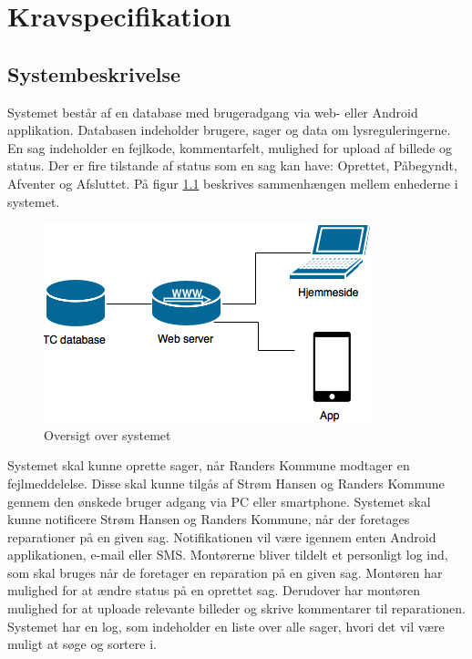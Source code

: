 	\chapter{Kravspecifikation}
	
		\section{Systembeskrivelse}
				Systemet består af en database med brugeradgang via web- eller Android applikation.
				Databasen indeholder brugere, sager og data om lysreguleringerne.
				En sag indeholder en fejlkode, kommentarfelt, mulighed for upload af billede og status.
				Der er fire tilstande af status som en sag kan have: Oprettet, Påbegyndt, Afventer og Afsluttet. På figur \ref{fig:OversigtSystembeskrivelsen} beskrives sammenhængen mellem enhederne i systemet.
				
				\begin{figure}[H]
					\centering
					\includegraphics[width=0.6\linewidth]{Kravspecifikation/Oversigtoversystem}
					\caption{Oversigt over systemet}
					\label{fig:OversigtSystembeskrivelsen}
				\end{figure}
				
				Systemet skal kunne oprette sager, når Randers Kommune modtager en fejlmeddelelse.
				Disse skal kunne tilgås af Strøm Hansen og Randers Kommune gennem den ønskede bruger adgang via PC eller smartphone.
				Systemet skal kunne notificere Strøm Hansen og Randers Kommune, når der foretages reparationer på en given sag. Notifikationen vil være igennem enten Android applikationen, e-mail eller SMS.
				Montørerne bliver tildelt et personligt log ind, som skal bruges når de foretager en reparation på en given sag.
				Montøren har mulighed for at ændre status på en oprettet sag. Derudover har montøren mulighed for at uploade relevante billeder og skrive kommentarer til reparationen.
				Systemet har en log, som indeholder en liste over alle sager, hvori det vil være muligt at søge og sortere i.
				
